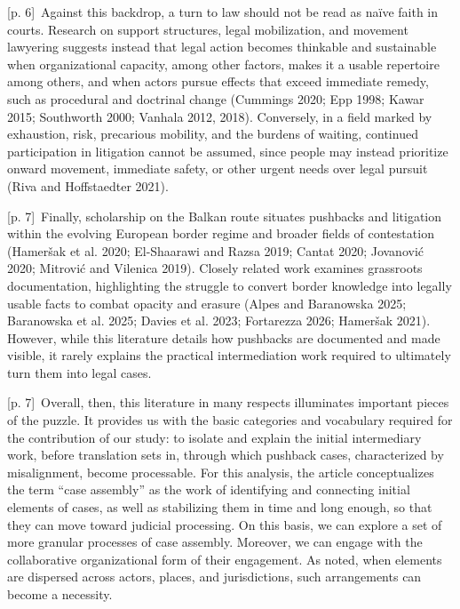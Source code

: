 \documentclass[10pt,a4paper]{article}
\begin{document}
{\scriptsize\color{gray} [p. 6]}\ Against this backdrop, a turn to law should not be read as naïve faith in courts. Research on support structures, legal mobilization, and movement lawyering suggests instead that legal action becomes thinkable and sustainable when organizational capacity, among other factors, makes it a usable repertoire among others, and when actors pursue effects that exceed immediate remedy, such as procedural and doctrinal change (Cummings 2020; Epp 1998; Kawar 2015; Southworth 2000; Vanhala 2012, 2018). Conversely, in a field marked by exhaustion, risk, precarious mobility, and the burdens of waiting, continued participation in litigation cannot be assumed, since people may instead prioritize onward movement, immediate safety, or other urgent needs over legal pursuit (Riva and Hoffstaedter 2021).\par
{\scriptsize\color{gray} [p. 7]}\ Finally, scholarship on the Balkan route situates pushbacks and litigation within the evolving European border regime and broader fields of contestation (Hameršak et al. 2020; El-Shaarawi and Razsa 2019; Cantat 2020; Jovanović 2020; Mitrović and Vilenica 2019). Closely related work examines grassroots documentation, highlighting the struggle to convert border knowledge into legally usable facts to combat opacity and erasure (Alpes and Baranowska 2025; Baranowska et al. 2025; Davies et al. 2023; Fortarezza 2026; Hameršak 2021). However, while this literature details how pushbacks are documented and made visible, it rarely explains the practical intermediation work required to ultimately turn them into legal cases.\par
{\scriptsize\color{gray} [p. 7]}\ Overall, then, this literature in many respects illuminates important pieces of the puzzle. It provides us with the basic categories and vocabulary required for the contribution of our study: to isolate and explain the initial intermediary work, before translation sets in, through which pushback cases, characterized by misalignment, become processable. For this analysis, the article conceptualizes the term “case assembly” as the work of identifying and connecting initial elements of cases, as well as stabilizing them in time and long enough, so that they can move toward judicial processing. On this basis, we can explore a set of more granular processes of case assembly. Moreover, we can engage with the collaborative organizational form of their engagement. As noted, when elements are dispersed across actors, places, and jurisdictions, such arrangements can become a necessity.\par
\end{document}
